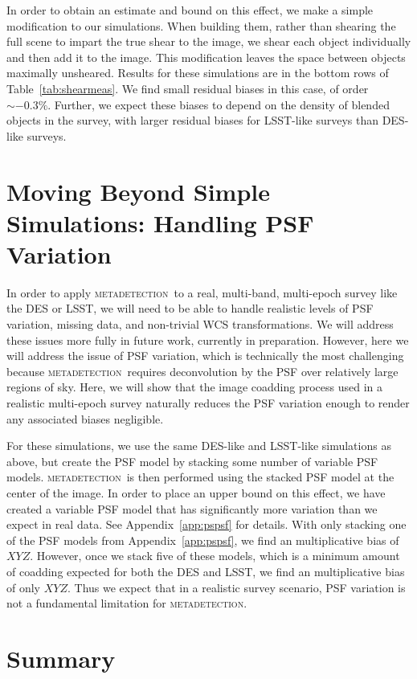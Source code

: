 \documentclass[fleqn,useAMS,usenatbib]{mnras}
\newcommand{\mdet}{\textsc{metadetection}}
\begin{document}
In order to obtain an estimate and bound on this effect, we make a simple
modification to our simulations. When building them, rather than shearing the
full scene to impart the true shear to the image, we shear each object
individually and then add it to the image. This modification leaves the space
between objects maximally unsheared. Results for these simulations are in the
bottom rows of Table~\ref{tab:shearmeas}. We find small residual biases in this
case, of order $\sim-0.3\%$. Further, we expect these biases to depend on
the density of blended objects in the survey, with larger residual biases
for LSST-like surveys than DES-like surveys.

\section{Moving Beyond Simple Simulations: Handling PSF Variation}
\label{sec:psfvar}

In order to apply \mdet\ to a real, multi-band, multi-epoch survey like the DES
or LSST, we will need to be able to handle realistic levels of PSF variation,
missing data, and non-trivial WCS transformations. We will address these issues
more fully in future work, currently in preparation. However, here we will
address the issue of PSF variation, which is technically the most challenging
because \mdet\ requires deconvolution by the PSF over relatively large regions
of sky. Here, we will show that the image coadding process used in a realistic
multi-epoch survey naturally reduces the PSF variation enough to render any
associated biases negligible.

For these simulations, we use the same DES-like and LSST-like simulations as above,
but create the PSF model by stacking some number of variable PSF models. \mdet\ is then
performed using the stacked PSF model at the center of the image. In order
to place an upper bound on this effect, we have created a variable PSF model that
has significantly more variation than we expect in real data. See Appendix~\ref{app:pspsf}
for details. With only stacking one of the PSF models from Appendix~\ref{app:pspsf},
we find an multiplicative bias of $XYZ$. However, once we stack five of these models,
which is a minimum amount of coadding expected for both the DES and LSST, we find
an multiplicative bias of only $XYZ$. Thus we expect that in a realistic survey
scenario, PSF variation is not a fundamental limitation for \mdet.


\section{Summary}
\end{document}
